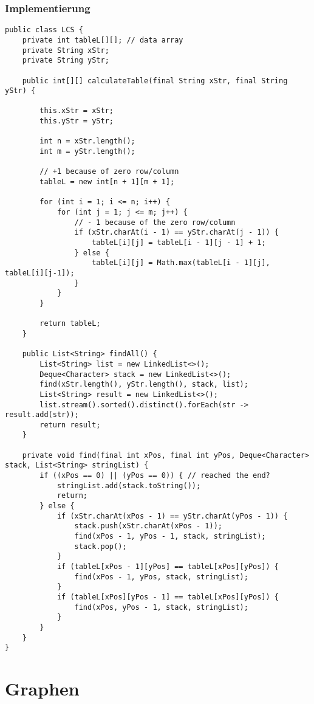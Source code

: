 \clearpage

\subsubsection{Implementierung}
\begin{lstlisting}
public class LCS {
	private int tableL[][]; // data array
	private String xStr;
	private String yStr;

	public int[][] calculateTable(final String xStr, final String yStr) {

		this.xStr = xStr;
		this.yStr = yStr;

		int n = xStr.length();
		int m = yStr.length();

		// +1 because of zero row/column
		tableL = new int[n + 1][m + 1];

		for (int i = 1; i <= n; i++) {
			for (int j = 1; j <= m; j++) {
				// - 1 because of the zero row/column
				if (xStr.charAt(i - 1) == yStr.charAt(j - 1)) {
					tableL[i][j] = tableL[i - 1][j - 1] + 1; 
				} else {
					tableL[i][j] = Math.max(tableL[i - 1][j], tableL[i][j-1]);
				}
			}
		}

		return tableL;
	}

	public List<String> findAll() {
		List<String> list = new LinkedList<>();
		Deque<Character> stack = new LinkedList<>();
		find(xStr.length(), yStr.length(), stack, list);
		List<String> result = new LinkedList<>();
		list.stream().sorted().distinct().forEach(str -> result.add(str));
		return result;
	}

	private void find(final int xPos, final int yPos, Deque<Character> stack, List<String> stringList) {
		if ((xPos == 0) || (yPos == 0)) { // reached the end?
			stringList.add(stack.toString());
			return;
		} else {
			if (xStr.charAt(xPos - 1) == yStr.charAt(yPos - 1)) {
				stack.push(xStr.charAt(xPos - 1));
				find(xPos - 1, yPos - 1, stack, stringList);
				stack.pop();
			}
			if (tableL[xPos - 1][yPos] == tableL[xPos][yPos]) {
				find(xPos - 1, yPos, stack, stringList);
			}
			if (tableL[xPos][yPos - 1] == tableL[xPos][yPos]) {
				find(xPos, yPos - 1, stack, stringList);
			}
		}
	}
}
\end{lstlisting}

\section{Graphen}
